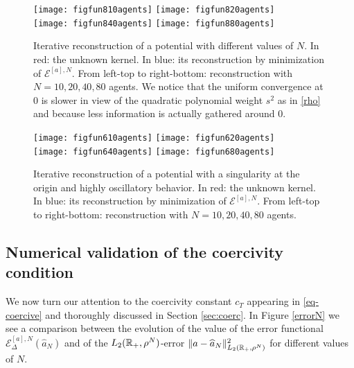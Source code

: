 \begin{figure}[h!]
\begin{center}
\hspace{-0.7cm}\texttt{[image: figfun810agents]}\hspace{-0.9cm}
\texttt{[image: figfun820agents]}\\
\hspace{-0.7cm}\texttt{[image: figfun840agents]}\hspace{-0.9cm}
\texttt{[image: figfun880agents]}
\end{center}
\caption{Iterative reconstruction of a potential with different values of $N$. In red: the unknown kernel. In blue: its reconstruction by minimization of $\mathcal{E}^{[a],N}$. From left-top to right-bottom: reconstruction with $N = 10, 20, 40, 80$ agents. We notice that the uniform convergence at $0$ is slower in view of the quadratic polynomial weight $s^2$ as in \eqref{rho} and because less information is actually gathered around $0$.}\label{variableN}
\end{figure}

\begin{figure}[h!]
\begin{center}
\hspace{-0.7cm}\texttt{[image: figfun610agents]}\hspace{-0.9cm}
\texttt{[image: figfun620agents]}\\
\hspace{-0.7cm}\texttt{[image: figfun640agents]}\hspace{-0.9cm}
\texttt{[image: figfun680agents]}
\end{center}
\caption{Iterative reconstruction of a potential with a singularity at the origin and highly oscillatory behavior. In red: the unknown kernel. In blue: its reconstruction by minimization of $\mathcal{E}^{[a],N}$. From left-top to right-bottom: reconstruction with $N = 10, 20, 40, 80$ agents.}\label{variableN2}
\end{figure}

\subsection{Numerical validation of the coercivity condition}\label{numcoer}

We now turn our attention to the coercivity constant $c_T$ appearing in \eqref{eq-coercive} and thoroughly discussed in Section \ref{sec:coerc}. In Figure \ref{errorN} we see a comparison between the evolution of the value of the error functional $\mathcal{E}^{[a],N}_\Delta(\widehat{a}_N)$ and of the $L_2(\mathbb{R}_+,\rho^N)$-error $\|a-\widehat{a}_N\|^2_{L_2(\mathbb{R}_+,\rho^N)}$ for different values of $N$. 

